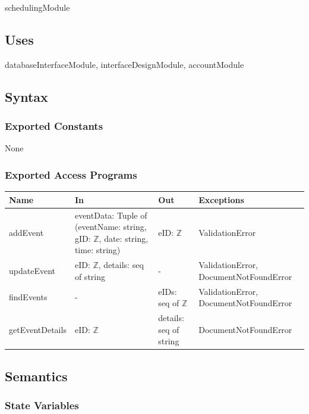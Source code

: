 \documentclass[12pt, titlepage]{article}
\begin{document}
schedulingModule


\subsection{Uses}

databaseInterfaceModule, interfaceDesignModule, accountModule

\subsection{Syntax}

\subsubsection{Exported Constants}

None

\subsubsection{Exported Access Programs}

\begin{center}
\begin{tabular}{p{3cm} p{4cm} p{4cm} p{4.5cm}}
\hline
\textbf{Name} & \textbf{In} & \textbf{Out} & \textbf{Exceptions} \\
\hline
addEvent & eventData: Tuple of (eventName: string, gID: $\mathbb{Z}$, date: string, time: string) & eID:  $\mathbb{Z}$ & ValidationError \\
\hline
updateEvent & eID: $\mathbb{Z}$, details: seq of string & - & ValidationError, DocumentNotFoundError \\
\hline
findEvents & - & eIDs: seq of $\mathbb{Z}$ & ValidationError, DocumentNotFoundError\\
\hline
getEventDetails & eID: $\mathbb{Z}$ & details: seq of string & DocumentNotFoundError\\
\hline
\end{tabular}
\end{center}

\subsection{Semantics}

\subsubsection{State Variables}
\end{document}
